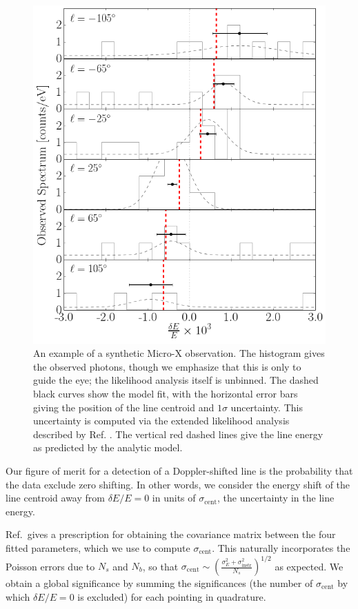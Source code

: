 \documentclass[aps,prd,10pt,twocolumn,superscriptaddress,showpacs,footinbib]{revtex4-1}
\begin{document}
\begin{figure}[h!]
\centering
\includegraphics[width=1.0\columnwidth]{example_obs.png}
\caption{ An example of a synthetic Micro-X observation. The histogram gives the observed photons,
	though we emphasize that this is only to guide the eye; the likelihood analysis itself is
	unbinned. The dashed black curves show the model fit, with the horizontal error bars giving the
	position of the line centroid and $1\sigma$ uncertainty. This uncertainty is computed via the
	extended likelihood analysis described by Ref. \cite{barlow1990}. The vertical red dashed lines give the line
	energy as predicted by the analytic model.
}
\label{fig:synobs}
\end{figure}



Our figure of merit for a detection of a Doppler-shifted line is the probability that the data
exclude zero shifting. In other words, we consider the energy shift of the line centroid
away from $\delta E/E=0$ in units of $\sigma_\mathrm{cent}$, the uncertainty in the line energy.

Ref.\,\cite{barlow1990} gives a prescription for obtaining the covariance matrix between the four fitted
parameters, which we use to compute $\sigma_\mathrm{cent}$. This naturally incorporates the Poisson errors due to
$N_s$ and $N_b$, so that $\sigma_\mathrm{cent} \sim \left(\frac{\sigma_E^2+\sigma_\mathrm{instr}^2
}{N_s}\right)^{1/2}$ as expected. 
We obtain a global significance by summing the significances (the
number of $\sigma_\mathrm{cent}$ by which $\delta E/E=0$ is excluded) for each
pointing in quadrature.
\end{document}
